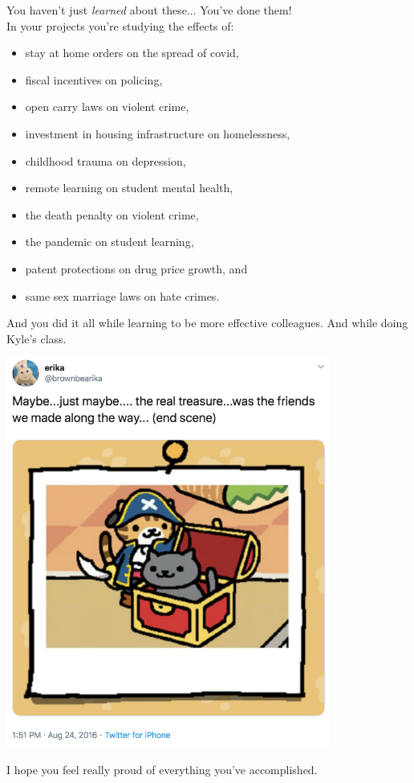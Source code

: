 \documentclass[11pt]{beamer}
\begin{document}
\begin{frame}[t]{You haven't just \emph{learned} about these...}
You've done them! \\
\pause 
In your projects you're studying the effects of:
\begin{itemize}
    \item stay at home orders on the spread of covid,
    \item fiscal incentives on policing,
    \item open carry laws on violent crime,
    \item investment in housing infrastructure on homelessness,
    \item childhood trauma on depression,
    \item remote learning on student mental health,
    \item the death penalty on violent crime, 
    \item the pandemic on student learning,
    \item patent protections on drug price growth, and
    \item same sex marriage laws on hate crimes.
\end{itemize}
\pause And you did it all while learning to be more effective colleagues.
\pause And while doing \alert{Kyle's class}.
\end{frame}
    

\begin{frame}[c]
\pause 
\centering
      \includegraphics[width=0.8\textwidth]{maybe_the_real_treasure.png}
\end{frame}

\begin{frame}[c]
    \centering 
    \alert{I hope you feel really proud of everything you've accomplished.}
\end{frame}
\end{document}
